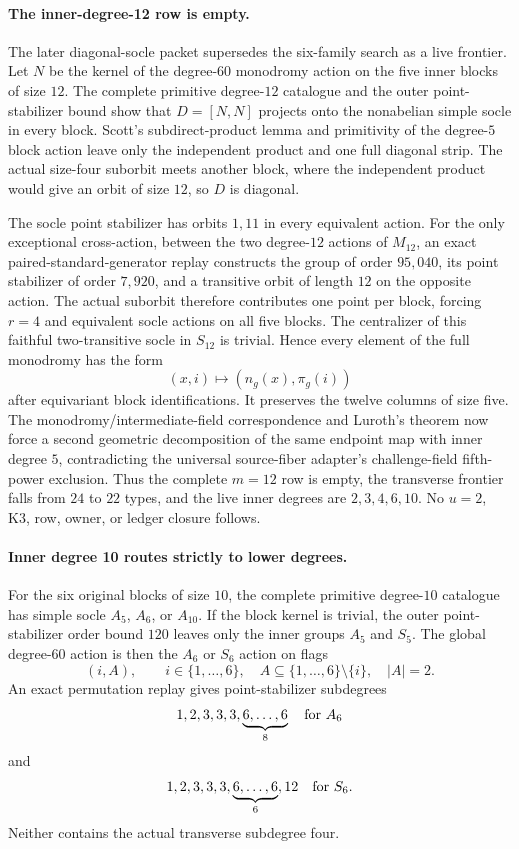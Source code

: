 \documentclass[11pt]{article}
\begin{document}
\paragraph{The inner-degree-12 row is empty.}
The later diagonal-socle packet supersedes the six-family search as a live
frontier.  Let \(N\) be the kernel of the degree-\(60\) monodromy action on
the five inner blocks of size \(12\).  The complete primitive degree-\(12\)
catalogue and the outer point-stabilizer bound show that
\(D=[N,N]\) projects onto the nonabelian simple socle in every block.
Scott's subdirect-product lemma and primitivity of the degree-\(5\) block
action leave only the independent product and one full diagonal strip.  The
actual size-four suborbit meets another block, where the independent product
would give an orbit of size \(12\), so \(D\) is diagonal.

The socle point stabilizer has orbits \(1,11\) in every equivalent action.
For the only exceptional cross-action, between the two degree-\(12\)
actions of \(M_{12}\), an exact paired-standard-generator replay constructs
the group of order \(95{,}040\), its point stabilizer of order \(7{,}920\),
and a transitive orbit of length \(12\) on the opposite action.  The actual
suborbit therefore contributes one point per block, forcing \(r=4\) and
equivalent socle actions on all five blocks.  The centralizer of this
faithful two-transitive socle in \(S_{12}\) is trivial.  Hence every element
of the full monodromy has the form
\[
  (x,i)\longmapsto(n_g(x),\pi_g(i))
\]
after equivariant block identifications.  It preserves the twelve columns
of size five.  The monodromy/intermediate-field correspondence and Luroth's
theorem now force a second geometric decomposition of the same endpoint map
with inner degree \(5\), contradicting the universal source-fiber adapter's
challenge-field fifth-power exclusion.  Thus the complete \(m=12\) row is
empty, the transverse frontier falls from \(24\) to \(22\) types, and the
live inner degrees are \(2,3,4,6,10\).  No \(u=2\), K3, row, owner, or
ledger closure follows.

\paragraph{Inner degree 10 routes strictly to lower degrees.}
For the six original blocks of size \(10\), the complete primitive
degree-\(10\) catalogue has simple socle \(A_5\), \(A_6\), or \(A_{10}\).
If the block kernel is trivial, the outer point-stabilizer order bound
\(120\) leaves only the inner groups \(A_5\) and \(S_5\).  The global
degree-\(60\) action is then the \(A_6\) or \(S_6\) action on flags
\[
  (i,A),\qquad i\in\{1,\ldots,6\},\quad
  A\subseteq\{1,\ldots,6\}\setminus\{i\},\quad |A|=2.
\]
An exact permutation replay gives point-stabilizer subdegrees
\[
  1,2,3,3,3,\underbrace{6,\ldots,6}_{8}
  \quad\hbox{for }A_6
\]
and
\[
  1,2,3,3,3,\underbrace{6,\ldots,6}_{6},12
  \quad\hbox{for }S_6.
\]
Neither contains the actual transverse subdegree four.
\end{document}
